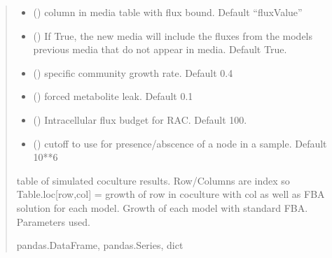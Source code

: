 \documentclass[letterpaper,10pt,english]{sphinxmanual}
\begin{document}
\begin{fulllineitems}
\begin{quote}
\begin{description}
\begin{itemize}
\item {} 
\sphinxAtStartPar
{} () \textendash{} column in media table with flux bound. Default “fluxValue”

\item {} 
\sphinxAtStartPar
{} () \textendash{} If True, the new media will include the fluxes from the models previous media that do not appear in media. Default True.

\item {} 
\sphinxAtStartPar
{} () \textendash{} specific community growth rate. Default 0.4

\item {} 
\sphinxAtStartPar
{} () \textendash{} forced metabolite leak. Default 0.1

\item {} 
\sphinxAtStartPar
{} () \textendash{} Intracellular flux budget for RAC. Default 100.

\item {} 
\sphinxAtStartPar
{} () \textendash{} cutoff to use for presence/abscence of a node in a sample. Default 10**\sphinxhyphen{}6

\end{itemize}

\sphinxAtStartPar
table of simulated co\sphinxhyphen{}culture results. Row/Columns are index so Table.loc{[}row,col{]} = growth of row in coculture with col as well as FBA solution for each model. Growth of each model with standard FBA. Parameters used.

\sphinxAtStartPar
pandas.DataFrame, pandas.Series, dict

\end{description}\end{quote}

\end{fulllineitems}

\end{document}
